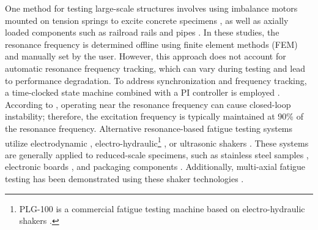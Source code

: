 \documentclass[preprint,12pt]{elsarticle}
\begin{document}
One method for testing large-scale structures involves using imbalance motors mounted on tension springs to excite concrete specimens \cite{SCHRAMM2024117045}, as well as axially loaded components such as railroad rails \cite{SCHNEIDER2018171,herrmann2018simulation_Thesis} and pipes \cite{Santus_2024}. In these studies, the resonance frequency is determined offline using finite element methods (FEM) and manually set by the user. However, this approach does not account for automatic resonance frequency tracking, which can vary during testing and lead to performance degradation. To address synchronization and frequency tracking, a time-clocked state machine combined with a PI controller is employed \cite{SCHRAMM2024117045,SCHNEIDER2018171,herrmann2018simulation_Thesis}. According to \cite{SCHNEIDER2018171}, operating near the resonance frequency can cause closed-loop instability; therefore, the excitation frequency is typically maintained at 90\% of the resonance frequency. Alternative resonance-based fatigue testing systems utilize electrodynamic \cite{Su2014,George_2006,CESNIK20125370,gautrelet2020resonance,DORANGA2024115368,Rouillard_2000}, electro-hydraulic\footnote{PLG-100 is a commercial fatigue testing machine based on electro-hydraulic shakers \cite{met11101512}.} \cite{Ji_2010,Rouillard_2000}, or ultrasonic shakers \cite{Stanzl01041980_fast_ultrasonic}. These systems are generally applied to reduced-scale specimens, such as stainless steel samples \cite{Gautrelet_2020}, electronic boards \cite{Su2014,feng2003development_Japaneese}, and packaging components \cite{Rouillard_2000}. Additionally, multi-axial fatigue testing has been demonstrated using these shaker technologies \cite{George_2006,Dupke2026}.
\end{document}
